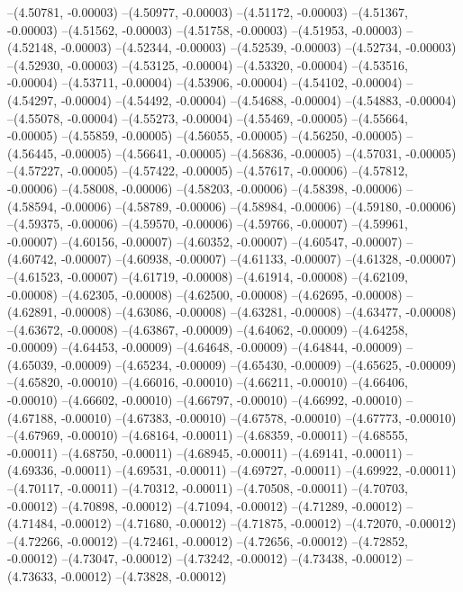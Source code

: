 --(4.50781, -0.00003)
--(4.50977, -0.00003)
--(4.51172, -0.00003)
--(4.51367, -0.00003)
--(4.51562, -0.00003)
--(4.51758, -0.00003)
--(4.51953, -0.00003)
--(4.52148, -0.00003)
--(4.52344, -0.00003)
--(4.52539, -0.00003)
--(4.52734, -0.00003)
--(4.52930, -0.00003)
--(4.53125, -0.00004)
--(4.53320, -0.00004)
--(4.53516, -0.00004)
--(4.53711, -0.00004)
--(4.53906, -0.00004)
--(4.54102, -0.00004)
--(4.54297, -0.00004)
--(4.54492, -0.00004)
--(4.54688, -0.00004)
--(4.54883, -0.00004)
--(4.55078, -0.00004)
--(4.55273, -0.00004)
--(4.55469, -0.00005)
--(4.55664, -0.00005)
--(4.55859, -0.00005)
--(4.56055, -0.00005)
--(4.56250, -0.00005)
--(4.56445, -0.00005)
--(4.56641, -0.00005)
--(4.56836, -0.00005)
--(4.57031, -0.00005)
--(4.57227, -0.00005)
--(4.57422, -0.00005)
--(4.57617, -0.00006)
--(4.57812, -0.00006)
--(4.58008, -0.00006)
--(4.58203, -0.00006)
--(4.58398, -0.00006)
--(4.58594, -0.00006)
--(4.58789, -0.00006)
--(4.58984, -0.00006)
--(4.59180, -0.00006)
--(4.59375, -0.00006)
--(4.59570, -0.00006)
--(4.59766, -0.00007)
--(4.59961, -0.00007)
--(4.60156, -0.00007)
--(4.60352, -0.00007)
--(4.60547, -0.00007)
--(4.60742, -0.00007)
--(4.60938, -0.00007)
--(4.61133, -0.00007)
--(4.61328, -0.00007)
--(4.61523, -0.00007)
--(4.61719, -0.00008)
--(4.61914, -0.00008)
--(4.62109, -0.00008)
--(4.62305, -0.00008)
--(4.62500, -0.00008)
--(4.62695, -0.00008)
--(4.62891, -0.00008)
--(4.63086, -0.00008)
--(4.63281, -0.00008)
--(4.63477, -0.00008)
--(4.63672, -0.00008)
--(4.63867, -0.00009)
--(4.64062, -0.00009)
--(4.64258, -0.00009)
--(4.64453, -0.00009)
--(4.64648, -0.00009)
--(4.64844, -0.00009)
--(4.65039, -0.00009)
--(4.65234, -0.00009)
--(4.65430, -0.00009)
--(4.65625, -0.00009)
--(4.65820, -0.00010)
--(4.66016, -0.00010)
--(4.66211, -0.00010)
--(4.66406, -0.00010)
--(4.66602, -0.00010)
--(4.66797, -0.00010)
--(4.66992, -0.00010)
--(4.67188, -0.00010)
--(4.67383, -0.00010)
--(4.67578, -0.00010)
--(4.67773, -0.00010)
--(4.67969, -0.00010)
--(4.68164, -0.00011)
--(4.68359, -0.00011)
--(4.68555, -0.00011)
--(4.68750, -0.00011)
--(4.68945, -0.00011)
--(4.69141, -0.00011)
--(4.69336, -0.00011)
--(4.69531, -0.00011)
--(4.69727, -0.00011)
--(4.69922, -0.00011)
--(4.70117, -0.00011)
--(4.70312, -0.00011)
--(4.70508, -0.00011)
--(4.70703, -0.00012)
--(4.70898, -0.00012)
--(4.71094, -0.00012)
--(4.71289, -0.00012)
--(4.71484, -0.00012)
--(4.71680, -0.00012)
--(4.71875, -0.00012)
--(4.72070, -0.00012)
--(4.72266, -0.00012)
--(4.72461, -0.00012)
--(4.72656, -0.00012)
--(4.72852, -0.00012)
--(4.73047, -0.00012)
--(4.73242, -0.00012)
--(4.73438, -0.00012)
--(4.73633, -0.00012)
--(4.73828, -0.00012)
